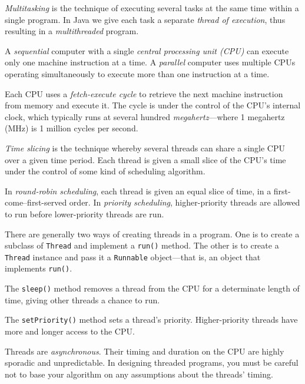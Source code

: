 \begin{SMBL}\baselineskip=11.9pt
\item  {\it Multitasking} is the technique of executing several
tasks at the same time within a single program.  In Java
we give each task a separate {\it thread of execution},
thus resulting in a {\it multithreaded} program.

\item  A {\it sequential} computer with a single {\it central
processing unit (CPU)} can execute only one machine instruction
at a time.  A {\it parallel} computer uses multiple CPUs operating
simultaneously to execute more than one instruction at a time.

\item  Each CPU uses a {\it fetch-execute cycle} to retrieve the
next machine instruction from memory and execute it.  The cycle is
under the control of the CPU's internal clock, which typically runs at
several hundred {\it megahertz}---where 1 megahertz (MHz) is 1
million cycles per second.

\item  {\it Time slicing} is the technique whereby several threads
can share a single CPU over a given time period.  Each thread is given
a small slice of the CPU's time under the control of some kind of
scheduling algorithm.  

\item In {\it round-robin scheduling}, each thread is
given an equal slice of time, in a first-come--first-served order.  In
{\it priority scheduling}, higher-priority threads are allowed to
run before lower-priority threads are run.

\item  There are generally two ways of creating threads in a program.
One is to create a subclass of {\tt Thread} and implement a
{\tt run()} method.  The other is to create a {\tt Thread} instance
and pass it a {\tt Runnable} object---that is, an object that
implements {\tt run()}.

\item  The {\tt sleep()} method removes a thread from the CPU
for a determinate length of time, giving other threads a chance
to run.

\item  The {\tt setPriority()} method sets a thread's priority.
Higher-priority threads have more and longer access to the CPU.

\item  Threads are {\it asynchronous}. Their timing and duration
on the CPU are highly sporadic and unpredictable.  In designing
threaded programs, you must be careful not to base your
algorithm on any assumptions about the threads' timing.


\end{SMBL}
